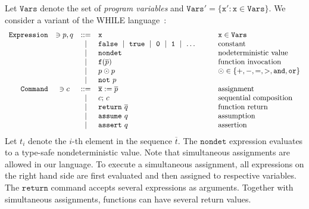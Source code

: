 
Let $\mathtt{Vars}$ denote the set of \emph{program variables} and
$\mathtt{Vars}' = \{ \mathtt{x}' : \mathtt{x} \in \mathtt{Vars} \}$.
We consider a variant of the WHILE language~\cite{NielsonHC99}:
\begin{equation*}
  \begin{array}{rccll}
    \mathtt{Expression} & \ni p, q & ::= &
    \mathtt{x} & \mathtt{x} \in \mathtt{Vars}\\
    & & \mid &
    \mathtt{false}\ \mid\ \mathtt{true}\ \mid\ 
    \mathtt{0}\ \mid\ \mathtt{1}\ \mid\ \ldots\hspace{.06\textwidth} &
    \textmd{constant}\\
    & & \mid &
    \mathtt{nondet} & \textmd{nodeterministic value}\\
    & & \mid &
    \mathtt{f}(\overline{p}) &
    \textmd{function invocation}\\
    & & \mid &
    p \odot p  & \odot \in \{ +, -, =, >, \mathtt{and}, \mathtt{or} \}\\
    & & \mid & \mathtt{not}\ p\\
    \mathtt{Command} & \ni c & ::= &
    \overline{\mathtt{x}} := \overline{p}
    & \textmd{assignment}\\
    & & \mid &
    c\mathtt{;}\ c &
    \textmd{sequential composition}\\
    & & \mid &
    \mathtt{return}\ \overline{q} & \textmd{function return}\\
    & & \mid &
    \mathtt{assume}\ q & \textmd{assumption}\\
    & & \mid &
    \mathtt{assert}\ q & \textmd{assertion}
  \end{array}
\end{equation*}
Let $t_i$ denote the $i$-th element in the sequence $\overline{t}$.
The $\mathtt{nondet}$ expression evaluates to a type-safe
nondeterministic value.
Note that simultaneous assignments are allowed in our language. To
execute a simultaneous assignment, all expressions on the right hand
side are first evaluated and then assigned to respective variables. 
The $\mathtt{return}$ command accepts several expressions as arguments.
Together with simultaneous assignments, functions can have several
return values. 

